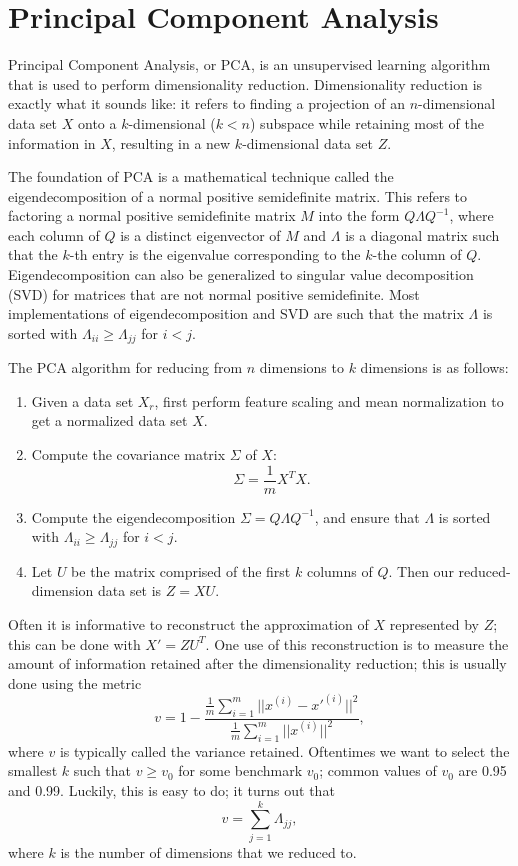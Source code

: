 \documentclass{article}
\begin{document}
\section{Principal Component Analysis}
Principal Component Analysis, or PCA, is an unsupervised learning algorithm that is used to perform dimensionality reduction. Dimensionality reduction is exactly what it sounds like: it refers to finding a projection of an $n$-dimensional data set $X$ onto a $k$-dimensional ($k < n$) subspace while retaining most of the information in $X$, resulting in a new $k$-dimensional data set $Z$.

The foundation of PCA is a mathematical technique called the eigendecomposition of a normal positive semidefinite matrix. This refers to factoring a normal positive semidefinite matrix $M$ into the form $Q\Lambda Q^{-1}$, where each column of $Q$ is a distinct eigenvector of $M$ and $\Lambda$ is a diagonal matrix such that the $k$-th entry is the eigenvalue corresponding to the $k$-the column of $Q$. Eigendecomposition can also be generalized to singular value decomposition (SVD) for matrices that are not normal positive semidefinite. Most implementations of eigendecomposition and SVD are such that the matrix $\Lambda$ is sorted with $\Lambda_{ii} \ge \Lambda_{jj}$ for $i < j$.

The PCA algorithm for reducing from $n$ dimensions to $k$ dimensions is as follows:
\begin{enumerate}
\item Given a data set $X_r$, first perform feature scaling and mean normalization to get a normalized data set $X$.
\item Compute the covariance matrix $\Sigma$ of $X$:
$$\Sigma = \frac{1}{m}X^TX.$$
\item Compute the eigendecomposition $\Sigma = Q\Lambda Q^{-1}$, and ensure that $\Lambda$ is sorted with $\Lambda_{ii} \ge \Lambda_{jj}$ for $i < j$.
\item Let $U$ be the matrix comprised of the first $k$ columns of $Q$. Then our reduced-dimension data set is $Z = XU$.
\end{enumerate}
Often it is informative to reconstruct the approximation of $X$ represented by $Z$; this can be done with $X' = ZU^T$. One use of this reconstruction is to measure the amount of information retained after the dimensionality reduction; this is usually done using the metric
$$v = 1 - \frac{\frac{1}{m} \sum_{i=1}^m ||x^{(i)} - x'^{(i)}||^2}{\frac{1}{m} \sum_{i=1}^m ||x^{(i)}||^2},$$
where $v$ is typically called the variance retained. Oftentimes we want to select the smallest $k$ such that $v \ge v_0$ for some benchmark $v_0$; common values of $v_0$ are 0.95 and 0.99. Luckily, this is easy to do; it turns out that
$$v = \sum_{j=1}^k \Lambda_{jj},$$
where $k$ is the number of dimensions that we reduced to.
\end{document}
